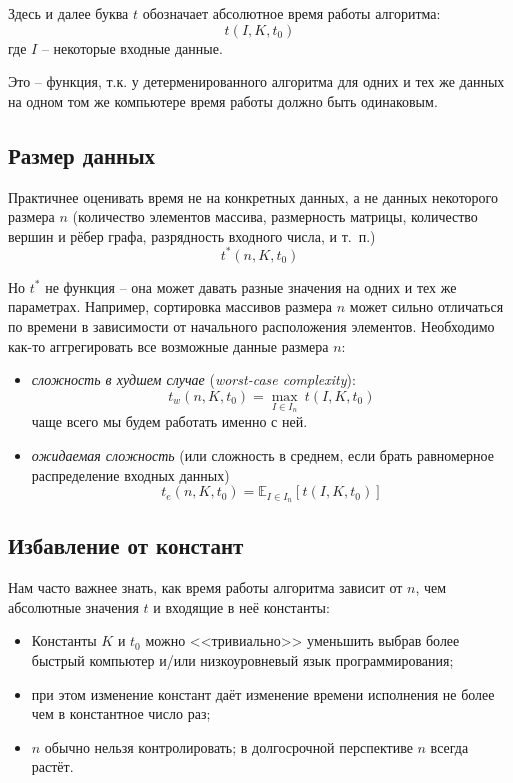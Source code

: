 \documentclass[12pt,a4paper]{report}
\begin{document}
Здесь и далее буква $t$ обозначает абсолютное время работы алгоритма:
$$
t(I, K, t_0)
$$
где $I$ -- некоторые входные данные.

Это -- функция, т.к. у детерменированного алгоритма для одних и тех же данных на одном том же компьютере время работы должно быть одинаковым.

\subsection*{Размер данных}

Практичнее оценивать время не на конкретных данных, а не данных некоторого размера $n$ (количество элементов массива, размерность матрицы, количество вершин и рёбер графа, разрядность входного числа, и т.~п.)
$$
t^*(n, K, t_0)
$$

Но $t^*$ не функция -- она может давать разные значения на одних и тех же параметрах. Например, сортировка массивов размера $n$ может сильно отличаться по времени в зависимости от начального расположения элементов. Необходимо как-то аггрегировать все возможные данные размера $n$: 

\begin{itemize}
\item {\em сложность в худшем случае} ({\em worst-case complexity}):
$$
\boxed{
  t_w(n, K, t_0) = \max_{I \in I_n}~{t(I, K, t_0)}  
}
$$
чаще всего мы будем работать именно с ней.
\item {\em ожидаемая сложность} (или сложность в среднем, если брать равномерное распределение входных данных)
$$
t_e(n, K, t_0) = \mathbb{E}_{I \in I_n} \left[ {t(I, K, t_0)} \right]
$$
\end{itemize}

\subsection*{Избавление от констант}

Нам часто важнее знать, как время работы алгоритма зависит от $n$, чем абсолютные значения $t$ и входящие в неё константы: 
\begin{itemize}
\item Константы $K$ и $t_0$ можно <<тривиально>> уменьшить выбрав более быстрый компьютер и/или низкоуровневый язык программирования;
\item при этом изменение констант даёт изменение времени исполнения не более чем в константное число раз;
\item $n$ обычно нельзя контролировать; в долгосрочной перспективе $n$ всегда растёт. 
\end{itemize}
\end{document}
